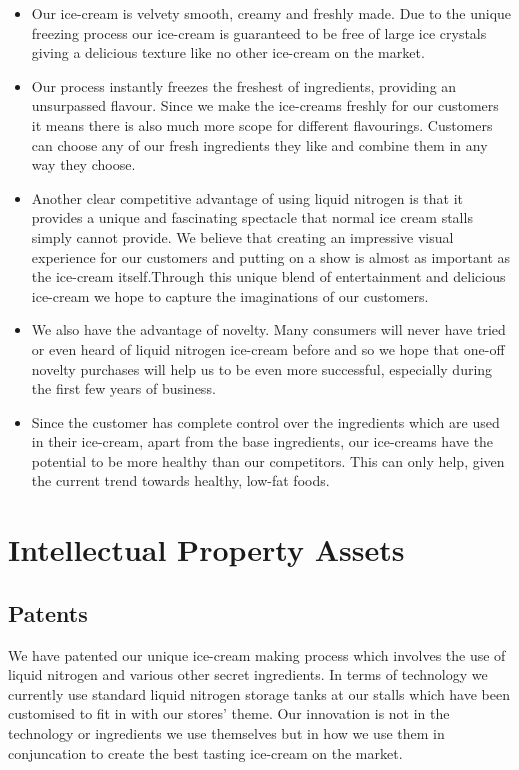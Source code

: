 \documentclass{article}
\begin{document}
  \begin{itemize}
  \item Our ice-cream is velvety smooth, creamy and freshly made. Due to the unique freezing process our ice-cream is guaranteed to be free of large ice crystals giving a delicious texture like no other ice-cream on the market.

  \item Our process instantly freezes the freshest of ingredients, providing an unsurpassed flavour. Since we make the ice-creams freshly for our customers it means there is also much more scope for different flavourings. Customers can choose any of our fresh ingredients they like and combine them in any way they choose.

  \item Another clear competitive advantage of using liquid nitrogen is that it provides a unique and fascinating spectacle that normal ice cream stalls simply cannot provide. We believe that creating an impressive visual experience for our customers and putting on a show is almost as important as the ice-cream itself.Through this unique blend of entertainment and delicious ice-cream we hope to capture the imaginations of our customers.

  \item We also have the advantage of novelty. Many consumers will never have tried or even heard of liquid nitrogen ice-cream before and so we hope that one-off novelty purchases will help us to be even more successful, especially during the first few years of business.

  \item Since the customer has complete control over the ingredients which are used in their ice-cream, apart from the base ingredients, our ice-creams have the potential to be more healthy than our competitors. This can only help, given the current trend towards healthy, low-fat foods.
  \end{itemize}

\section{Intellectual Property Assets}

  \subsection{Patents}

  We have patented our unique ice-cream making process which involves the use of liquid nitrogen and various other secret ingredients. In terms of technology we currently use standard liquid nitrogen storage tanks at our stalls which have been customised to fit in with our stores' theme. Our innovation is not in the technology or ingredients we use themselves but in how we use them in conjuncation to create the best tasting ice-cream on the market.
\end{document}
